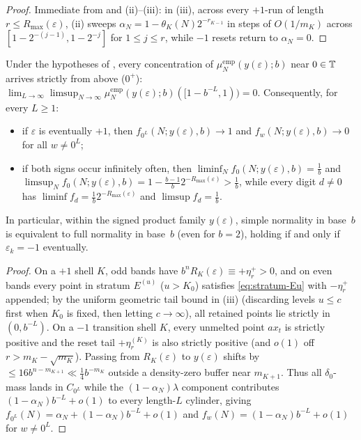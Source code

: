 \documentclass[11pt]{article}
\begin{document}
\begin{proof}
Immediate from  and (ii)--(iii): in (iii), across every $+1$-run of length $r\le R_{\max}(\varepsilon)$, (ii) sweeps $\alpha_N=1-\theta_K(N)2^{-r_{K-1}}$ in steps of $O(1/m_K)$ across $[1-2^{-(j-1)},1-2^{-j}]$ for $1\le j\le r$, while $-1$ resets return to $\alpha_N=0$.
\end{proof}

\begin{theorem}\label{thm:oriented-digits}
Under the hypotheses of , every concentration of $\mu_N^{\mathrm{emp}}(y(\varepsilon);b)$ near $0\in\mathbb T$ arrives strictly from above ($0^+$): $\lim_{L\to\infty}\limsup_{N\to\infty}\mu_N^{\mathrm{emp}}(y(\varepsilon);b)([1-b^{-L},1))=0$. Consequently, for every $L\ge1$:
\begin{itemize}[nosep]
\item if $\varepsilon$ is eventually $+1$, then $f_{0^L}(N;y(\varepsilon),b)\to1$ and $f_w(N;y(\varepsilon),b)\to0$ for all $w\neq 0^L$;
\item if both signs occur infinitely often, then $\liminf_N f_0(N;y(\varepsilon),b)=\frac1b$ and $\limsup_N f_0(N;y(\varepsilon),b)=1-\frac{b-1}{b}2^{-R_{\max}(\varepsilon)}>\frac1b$, while every digit $d\neq0$ has $\liminf f_d=\frac1b 2^{-R_{\max}(\varepsilon)}$ and $\limsup f_d=\frac1b$.
\end{itemize}
In particular, within the signed product family $y(\varepsilon)$, simple normality in base~$b$ is equivalent to full normality in base~$b$ (even for $b=2$), holding if and only if $\varepsilon_k=-1$ eventually.
\end{theorem}

\begin{proof}
On a $+1$ shell $K$, odd bands have $b^nR_K(\varepsilon)\equiv+\eta_r^+>0$, and on even bands every point in stratum $E^{(u)}$ ($u>K_0$) satisfies \eqref{eq:stratum-Eu} with $-\eta_r^+$ appended; by the uniform geometric tail bound in (iii) (discarding levels $u\le c$ first when $K_0$ is fixed, then letting $c\to\infty$), all retained points lie strictly in $(0,b^{-L})$. On a $-1$ transition shell $K$, every unmelted point $ax_t$ is strictly positive and the reset tail $+\eta_r^{(K)}$ is also strictly positive (and $o(1)$ off $r>m_K-\sqrt{m_K}$). Passing from $R_K(\varepsilon)$ to $y(\varepsilon)$ shifts by $\le 16b^{n-m_{K+1}}\ll\frac14b^{-m_K}$ outside a density-zero buffer near $m_{K+1}$. Thus all $\delta_0$-mass lands in $C_{0^L}$ while the $(1-\alpha_N)\lambda$ component contributes $(1-\alpha_N)b^{-L}+o(1)$ to every length-$L$ cylinder, giving $f_{0^L}(N)=\alpha_N+(1-\alpha_N)b^{-L}+o(1)$ and $f_w(N)=(1-\alpha_N)b^{-L}+o(1)$ for $w\neq 0^L$.
\end{proof}
\end{document}
